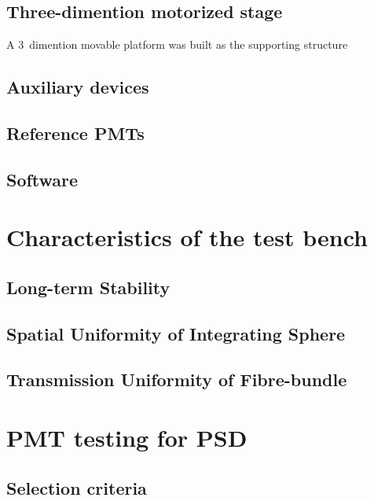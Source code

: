 \documentclass[preprint,3p,times]{elsarticle}
\begin{document}
\subsection{Three-dimention motorized stage}
\label{sec:platform}

A 3~dimention movable platform was built as the supporting structure

\subsection{Auxiliary devices}
\label{sec:integrating_sphere}

\subsection{Reference PMTs}
\label{sec:ref_pmt}

\subsection{Software}
\label{sec:control_daq}

\section{Characteristics of the test bench}
\label{sec:char_testbench}

\subsection{Long-term Stability}
\label{sec:longterm_stability}

\subsection{Spatial Uniformity of Integrating Sphere}
\label{sec:spatialuniformity_insph}

\subsection{Transmission Uniformity of Fibre-bundle}
\label{sec:transuniformity_fibre}

\section{PMT testing for PSD}
\label{sec:pmt_test}

\subsection{Selection criteria}
\label{sec:selection}
\end{document}

